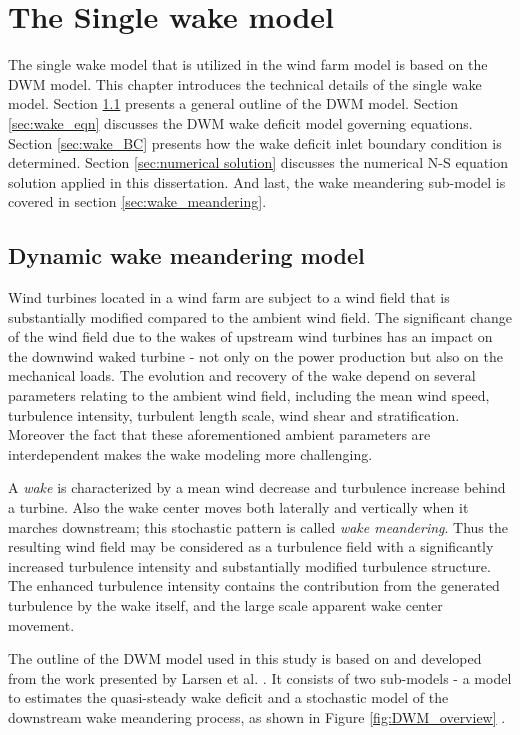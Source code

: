 \documentclass{umthesis}
\begin{document}
\chapter{The Single wake model} \label{chap:DWM_detail}
The single wake model that is utilized in the wind farm model is based on the DWM model. This chapter introduces the technical details of the single wake model. Section \ref{sec:DWM_overview} presents a general outline of the DWM model. Section \ref{sec:wake_eqn} discusses the DWM wake deficit model governing equations. Section \ref{sec:wake_BC} presents how the wake deficit inlet boundary condition is determined. Section \ref{sec:numerical solution} discusses the numerical N-S equation solution applied in this dissertation. And last, the wake meandering sub-model is covered in section \ref{sec:wake_meandering}.

\section{Dynamic wake meandering model}\label{sec:DWM_overview}
Wind turbines located in a wind farm are subject to a wind field that is substantially modified compared to the ambient wind field. The significant change of the wind field due to the wakes of upstream wind turbines has an impact on the downwind waked turbine - not only on the power production but also on the mechanical loads. The evolution and recovery of the wake depend on several parameters relating to the ambient wind field, including the mean wind speed, turbulence intensity, turbulent length scale, wind shear and stratification. Moreover the fact that these aforementioned ambient parameters are interdependent makes the wake modeling more challenging.

A \textit{wake} is characterized by a mean wind decrease and turbulence increase behind a turbine. Also the wake center moves both laterally and vertically when it marches downstream; this stochastic pattern is called \textit{wake meandering}. Thus the resulting wind field may be considered as a turbulence field with a significantly increased turbulence intensity and substantially modified turbulence structure. The enhanced turbulence intensity contains the contribution from the generated turbulence by the wake itself, and the large scale apparent wake center movement.

The outline of the DWM model used in this study is based on and developed from the work presented by Larsen et al. \cite{Larsen_wake}. It consists of two sub-models - a model to estimates the quasi-steady wake deficit and a stochastic model of the downstream wake meandering process, as shown in Figure \ref{fig:DWM_overview} \cite{Keck_mixing}.
\end{document}
